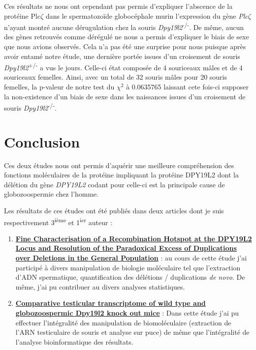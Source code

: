 \documentclass[12pt,twoside]{reedthesis}
\providecommand{\tightlist}{%
  \setlength{\itemsep}{0pt}\setlength{\parskip}{0pt}}
\theoremstyle{definition}
\theoremstyle{definition}
\theoremstyle{remark}
\begin{document}
  Ces résultats ne nous ont cependant pas permis d'expliquer l'abscence de
  la protéine Plc\(\zeta\) dans le spermatozoïde globocéphale murin
  l'expression du gène \emph{Plc}\(\zeta\) n'ayant montré aucune
  dérugulation chez la souris \emph{Dpy19l2}\textsuperscript{-/-}. De
  même, aucun des gènes retrouvés comme dérégulé ne nous a permis
  d'expliquer le biais de sexe que nous avions observés. Cela n'a pas été
  une surprise pour nous puisque après avoir entamé notre étude, une
  dernière portée issues d'un croisement de souris
  \emph{Dpy19l2}\textsuperscript{+/-} a vus le jours. Celle-ci état
  composée de 4 souriceaux mâles et de 4 souriceaux femelles. Ainsi, avec
  un total de 32 souris mâles pour 20 souris femelles, la p-valeur de
  notre test du \(\chi^2\) à 0.0635765 laissant cete fois-ci supposer la
  non-existence d'un biais de sexe dans les naissances issues d'un
  croisement de souris \emph{Dpy19l2}\textsuperscript{-/-}.
  
  \section{Conclusion}\label{conclusion}
  
  Ces deux études nous ont permis d'aquérir une meilleure compréhension
  des fonctions moléculaires de la protéine impliquant la protéine DPY19L2
  dont la délétion du gène \emph{DPY19L2} codant pour celle-ci est la
  principale cause de globozoospermie chez l'homme.
  
  Les résultats de ces études ont été publiés dans deux articles dont je
  suis respectivement 3\textsuperscript{ième} et 1\textsuperscript{ier}
  auteur :
  
  \begin{enumerate}
  \def\labelenumi{\arabic{enumi}.}
  \tightlist
  \item
    \protect\hyperlink{mecamut}{\textbf{Fine Characterisation of a
    Recombination Hotspot at the DPY19L2 Locus and Resolution of the
    Paradoxical Excess of Duplications over Deletions in the General
    Population}} : au cours de cette étude j'ai participé à divers
    manipulation de biologie moléculaire tel que l'extraction d'ADN
    spermatique, quantification des délétions / duplications \emph{de
    novo}. De même, j'ai pu contribuer au divers analyses statistiques.\\
  \item
    \protect\hyperlink{transcriptome}{\textbf{Comparative testicular
    transcriptome of wild type and globozoospermic Dpy19l2 knock out
    mice}} : Dans cette étude j'ai pu effectuer l'intégralité des
    manipulation de biomoléculaire (extraction de l'ARN testiculaire de
    souris et analyse sur puce) de même que l'intégralité de l'analyse
    bioinformatique des résultats.
  \end{enumerate}
  
\end{document}

